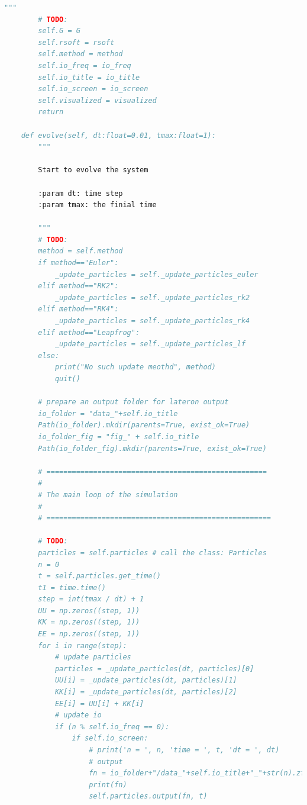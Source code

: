 \documentclass[12pt]{article}
\begin{document}
\begin{lstlisting}[language={Python}]
        """
        # TODO:
        self.G = G
        self.rsoft = rsoft
        self.method = method
        self.io_freq = io_freq
        self.io_title = io_title
        self.io_screen = io_screen
        self.visualized = visualized
        return

    def evolve(self, dt:float=0.01, tmax:float=1):
        """

        Start to evolve the system

        :param dt: time step
        :param tmax: the finial time
        
        """
        # TODO:
        method = self.method
        if method=="Euler":
            _update_particles = self._update_particles_euler
        elif method=="RK2":
            _update_particles = self._update_particles_rk2
        elif method=="RK4":
            _update_particles = self._update_particles_rk4   
        elif method=="Leapfrog":
            _update_particles = self._update_particles_lf
        else:
            print("No such update meothd", method)
            quit() 

        # prepare an output folder for lateron output
        io_folder = "data_"+self.io_title
        Path(io_folder).mkdir(parents=True, exist_ok=True)
        io_folder_fig = "fig_" + self.io_title
        Path(io_folder_fig).mkdir(parents=True, exist_ok=True)
        
        # ====================================================
        #
        # The main loop of the simulation
        #
        # =====================================================

        # TODO:
        particles = self.particles # call the class: Particles
        n = 0
        t = self.particles.get_time()
        t1 = time.time()
        step = int(tmax / dt) + 1
        UU = np.zeros((step, 1))
        KK = np.zeros((step, 1))
        EE = np.zeros((step, 1))
        for i in range(step):
            # update particles
            particles = _update_particles(dt, particles)[0]
            UU[i] = _update_particles(dt, particles)[1]
            KK[i] = _update_particles(dt, particles)[2]
            EE[i] = UU[i] + KK[i]
            # update io
            if (n % self.io_freq == 0):
                if self.io_screen:
                    # print('n = ', n, 'time = ', t, 'dt = ', dt)
                    # output
                    fn = io_folder+"/data_"+self.io_title+"_"+str(n).zfill(5)+".txt"
                    print(fn)
                    self.particles.output(fn, t)


\end{lstlisting}
\end{document}
